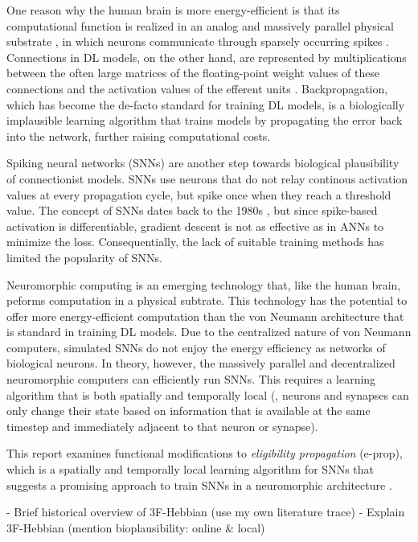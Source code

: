 One reason why the human brain is more energy-efficient is that its computational function is realized in an analog and massively parallel physical substrate \citep{a2017parallel}, in which neurons communicate through sparsely occurring spikes \citep{bear2020neuroscience}.
Connections in DL models, on the other hand, are represented by multiplications between the often large matrices of the floating-point weight values of these connections and the activation values of the efferent units \citep{lecun2015deep}.
Backpropagation, which has become the de-facto standard for training DL models, is a biologically implausible learning algorithm that trains models by propagating the error back into the network, further raising computational costs.

Spiking neural networks (SNNs) are another step towards biological plausibility of connectionist models.
SNNs use neurons that do not relay continous activation values at every propagation cycle, but spike once when they reach a threshold value.
The concept of SNNs dates back to the 1980s \citep{hopfield1982neural}, but since spike-based activation is differentiable, gradient descent is not as effective as in ANNs to minimize the loss.
Consequentially, the lack of suitable training methods has limited the popularity of SNNs.

Neuromorphic computing is an emerging technology that, like the human brain, peforms computation in a physical subtrate.
This technology has the potential to offer more energy-efficient computation than the von Neumann architecture that is standard in training DL models.
Due to the centralized nature of von Neumann computers, simulated SNNs do not enjoy the energy efficiency as networks of biological neurons.
In theory, however, the massively parallel and decentralized neuromorphic computers can efficiently run SNNs.
This requires a learning algorithm that is both spatially and temporally local (\ie, neurons and synapses can only change their state based on information that is available at the same timestep and immediately adjacent to that neuron or synapse).

This report examines functional modifications to \emph{eligibility propagation} (e-prop), which is a spatially and temporally local learning algorithm for SNNs that suggests a promising approach to train SNNs in a neuromorphic architecture \citep{bellec2020solution}.

\begin{tcolorbox}[colback=orange]
- Brief historical overview of 3F-Hebbian (use my own literature trace)
    - Explain 3F-Hebbian (mention bioplausibility: online \& local)


\vspace{10cm}

\end{tcolorbox}

